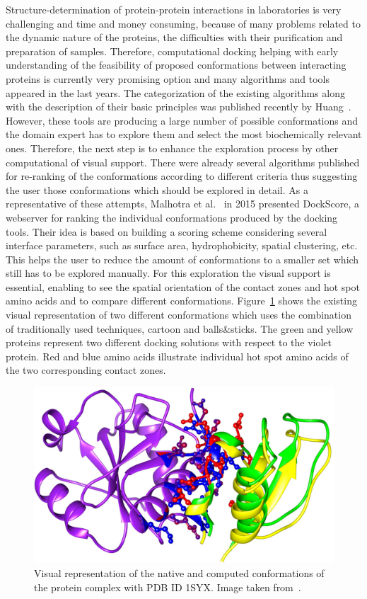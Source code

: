 \documentclass[journal]{vgtc}                %
\begin{document}
Structure-determination of protein-protein interactions in laboratories is very challenging and time and money consuming, because of many problems related to the dynamic nature of the proteins, the difficulties with their purification and preparation of samples.
Therefore, computational docking helping with early understanding of the feasibility of proposed conformations between interacting proteins is currently very promising option and many algorithms and tools appeared in the last years.
The categorization of the existing algorithms along with the description of their basic principles was published recently by Huang~\cite{Huang2014}.
However, these tools are producing a large number of possible conformations and the domain expert has to explore them and select the most biochemically relevant ones. 
Therefore, the next step is to enhance the exploration process by other computational of visual support.
There were already several algorithms published for re-ranking of the conformations according to different criteria thus suggesting the user those conformations which should be explored in detail.
As a representative of these attempts, Malhotra et al.~\cite{Malhotra2015} in 2015 presented DockScore, a webserver for ranking the individual conformations produced by the docking tools. 
Their idea is based on building a scoring scheme considering several interface parameters, such as surface area, hydrophobicity, spatial clustering, etc.
This helps the user to reduce the amount of conformations to a smaller set which still has to be explored manually.
For this exploration the visual support is essential, enabling to see the spatial orientation of the contact zones and hot spot amino acids and to compare different conformations.
Figure~\ref{fig:dockscore} shows the existing visual representation of two different conformations which uses the combination of traditionally used techniques, cartoon and balls\&sticks.
The green and yellow proteins represent two different docking solutions with respect to the violet protein. 
Red and blue amino acids illustrate individual hot spot amino acids of the two corresponding contact zones.

\begin{figure}[bt]
  \centering
  \includegraphics[width=1.0\columnwidth]{dockscore.png}
  \caption{Visual representation of the native and computed conformations of the protein complex with PDB ID 1SYX. Image taken from~\cite{Malhotra2015}.}
  \label{fig:dockscore}
\end{figure}
\end{document}
